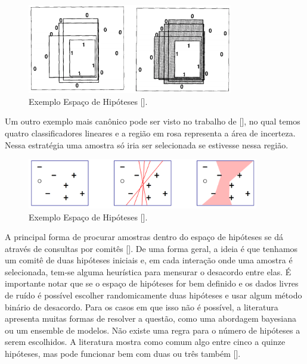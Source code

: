 \begin{figure}
  \centering
  \includegraphics[width=0.8\textwidth]{figures/cohn_1994_hypothesis_space_example.png}
  \caption{Exemplo Espaço de Hipóteses [\cite{cohn1994improving}].}
  \label{fig:cohn_1994_hypothesis_space_example}
\end{figure}

Um outro exemplo mais canônico pode ser visto no trabalho de [\cite{dasgupta2011two}], no qual temos quatro classificadores lineares e a região em rosa representa a área de incerteza. Nessa estratégia uma amostra só iria ser selecionada se estivesse nessa região.

\begin{figure}
  \centering
  \includegraphics[width=0.9\textwidth]{figures/dasgupta_two_faces_hypothesis_example.png}
  \caption{Exemplo Espaço de Hipóteses [\cite{dasgupta2011two}].}
  \label{fig:dasgupta_two_faces_hypothesis_example}
\end{figure}


A principal forma de procurar amostras dentro do espaço de hipóteses se dá através de consultas por comitês [\cite{seung1992query}]. De uma forma geral, a ideia é que tenhamos um comitê de duas hipóteses iniciais e, em cada interação onde uma amostra é selecionada, tem-se alguma heurística para mensurar o desacordo entre elas. É importante notar que se o espaço de hipóteses for bem definido e os dados livres de ruído é possível escolher randomicamente duas hipóteses e usar algum método binário de desacordo. Para os casos em que isso não é possível, a literatura apresenta muitas formas de resolver a questão, como uma abordagem bayesiana ou um ensemble de modelos. Não existe uma regra para o número de hipóteses a serem escolhidos. A literatura mostra como comum algo entre cinco a quinze hipóteses, mas pode funcionar bem com duas ou três também [\cite{settles2014active}]. 


